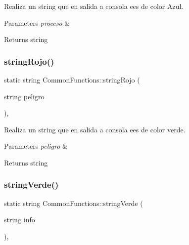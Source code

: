 Realiza un string que en salida a consola ees de color Azul. 


\begin{DoxyParams}{Parameters}
{\em proceso} & \\
\hline
\end{DoxyParams}
\begin{DoxyReturn}{Returns}
string 
\end{DoxyReturn}
\mbox{\label{classCommonFunctions_a2d9910d407ce3d46d934068f6bacfe08}} 
\subsubsection{\texorpdfstring{string\+Rojo()}{stringRojo()}}
{\footnotesize\ttfamily static string Common\+Functions\+::string\+Rojo (\begin{DoxyParamCaption}\item[{string}]{peligro }\end{DoxyParamCaption})\hspace{0.3cm}{\ttfamily [inline]}, {\ttfamily [static]}}



Realiza un string que en salida a consola ees de color verde. 


\begin{DoxyParams}{Parameters}
{\em peligro} & \\
\hline
\end{DoxyParams}
\begin{DoxyReturn}{Returns}
string 
\end{DoxyReturn}
\mbox{\label{classCommonFunctions_a00300c316aebf02cd5917c7335247fba}} 
\subsubsection{\texorpdfstring{string\+Verde()}{stringVerde()}}
{\footnotesize\ttfamily static string Common\+Functions\+::string\+Verde (\begin{DoxyParamCaption}\item[{string}]{info }\end{DoxyParamCaption})\hspace{0.3cm}{\ttfamily [inline]}, {\ttfamily [static]}}



